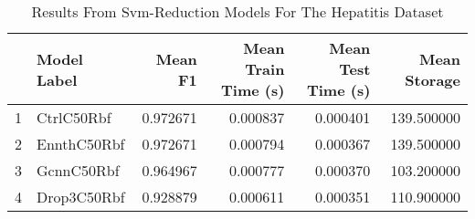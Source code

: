 \begin{table}[!htbp]
\centering
\caption{Results From Svm-Reduction Models For The Hepatitis Dataset}
\label{tab:svm_reduction_results_hepatitis}
\begin{tabular}{rlrrrr}
\toprule
 & Model Label & Mean F1 & Mean Train Time (s) & Mean Test Time (s) & Mean Storage \\
\midrule
1 & CtrlC50Rbf & 0.972671 & 0.000837 & 0.000401 & 139.500000 \\
2 & EnnthC50Rbf & 0.972671 & 0.000794 & 0.000367 & 139.500000 \\
3 & GcnnC50Rbf & 0.964967 & 0.000777 & 0.000370 & 103.200000 \\
4 & Drop3C50Rbf & 0.928879 & 0.000611 & 0.000351 & 110.900000 \\
\bottomrule
\end{tabular}
\end{table}
